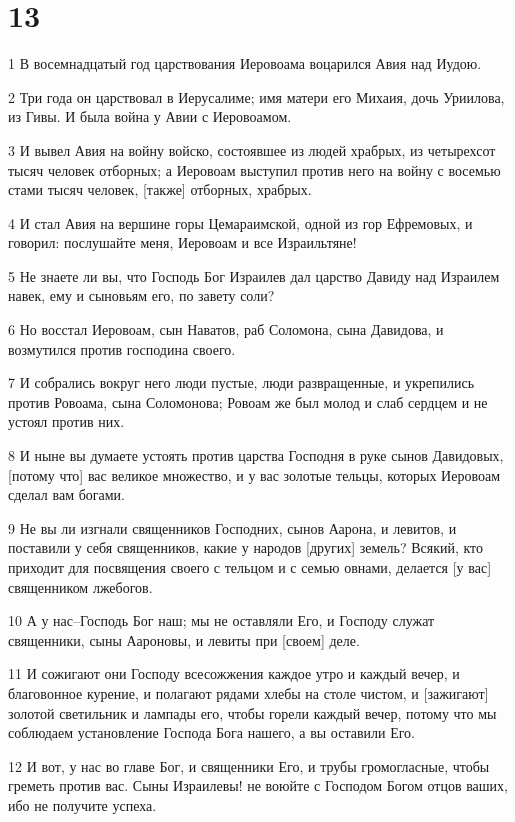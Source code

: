 \chapter{13}

\par 1 В восемнадцатый год царствования Иеровоама воцарился Авия над Иудою.
\par 2 Три года он царствовал в Иерусалиме; имя матери его Михаия, дочь Уриилова, из Гивы. И была война у Авии с Иеровоамом.
\par 3 И вывел Авия на войну войско, состоявшее из людей храбрых, из четырехсот тысяч человек отборных; а Иеровоам выступил против него на войну с восемью стами тысяч человек, [также] отборных, храбрых.
\par 4 И стал Авия на вершине горы Цемараимской, одной из гор Ефремовых, и говорил: послушайте меня, Иеровоам и все Израильтяне!
\par 5 Не знаете ли вы, что Господь Бог Израилев дал царство Давиду над Израилем навек, ему и сыновьям его, по завету соли?
\par 6 Но восстал Иеровоам, сын Наватов, раб Соломона, сына Давидова, и возмутился против господина своего.
\par 7 И собрались вокруг него люди пустые, люди развращенные, и укрепились против Ровоама, сына Соломонова; Ровоам же был молод и слаб сердцем и не устоял против них.
\par 8 И ныне вы думаете устоять против царства Господня в руке сынов Давидовых, [потому что] вас великое множество, и у вас золотые тельцы, которых Иеровоам сделал вам богами.
\par 9 Не вы ли изгнали священников Господних, сынов Аарона, и левитов, и поставили у себя священников, какие у народов [других] земель? Всякий, кто приходит для посвящения своего с тельцом и с семью овнами, делается [у вас] священником лжебогов.
\par 10 А у нас--Господь Бог наш; мы не оставляли Его, и Господу служат священники, сыны Аароновы, и левиты при [своем] деле.
\par 11 И сожигают они Господу всесожжения каждое утро и каждый вечер, и благовонное курение, и полагают рядами хлебы на столе чистом, и [зажигают] золотой светильник и лампады его, чтобы горели каждый вечер, потому что мы соблюдаем установление Господа Бога нашего, а вы оставили Его.
\par 12 И вот, у нас во главе Бог, и священники Его, и трубы громогласные, чтобы греметь против вас. Сыны Израилевы! не воюйте с Господом Богом отцов ваших, ибо не получите успеха.
